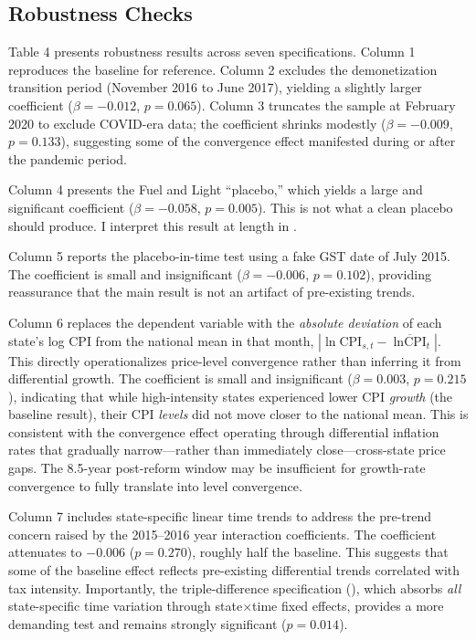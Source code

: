 \documentclass[12pt]{article}
\begin{document}
\subsection{Robustness Checks}\label{sec:robustness}

Table 4 presents robustness results across seven specifications. Column 1 reproduces the baseline for reference. Column 2 excludes the demonetization transition period (November 2016 to June 2017), yielding a slightly larger coefficient ($\beta = -0.012$, $p = 0.065$). Column 3 truncates the sample at February 2020 to exclude COVID-era data; the coefficient shrinks modestly ($\beta = -0.009$, $p = 0.133$), suggesting some of the convergence effect manifested during or after the pandemic period.

\begin{landscape}

\end{landscape}

Column 4 presents the Fuel and Light ``placebo,'' which yields a large and significant coefficient ($\beta = -0.058$, $p = 0.005$). This is not what a clean placebo should produce. I interpret this result at length in .

Column 5 reports the placebo-in-time test using a fake GST date of July 2015. The coefficient is small and insignificant ($\beta = -0.006$, $p = 0.102$), providing reassurance that the main result is not an artifact of pre-existing trends.

Column 6 replaces the dependent variable with the \textit{absolute deviation} of each state's log CPI from the national mean in that month, $|\ln \text{CPI}_{s,t} - \overline{\ln \text{CPI}}_t|$. This directly operationalizes price-level convergence rather than inferring it from differential growth. The coefficient is small and insignificant ($\beta = 0.003$, $p = 0.215$), indicating that while high-intensity states experienced lower CPI \textit{growth} (the baseline result), their CPI \textit{levels} did not move closer to the national mean. This is consistent with the convergence effect operating through differential inflation rates that gradually narrow---rather than immediately close---cross-state price gaps. The 8.5-year post-reform window may be insufficient for growth-rate convergence to fully translate into level convergence.

Column 7 includes state-specific linear time trends to address the pre-trend concern raised by the 2015--2016 year interaction coefficients. The coefficient attenuates to $-0.006$ ($p = 0.270$), roughly half the baseline. This suggests that some of the baseline effect reflects pre-existing differential trends correlated with tax intensity. Importantly, the triple-difference specification (), which absorbs \textit{all} state-specific time variation through state$\times$time fixed effects, provides a more demanding test and remains strongly significant ($p = 0.014$).
\end{document}
